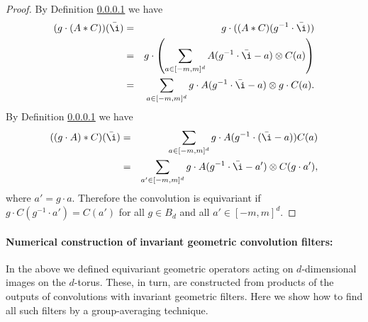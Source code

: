 \documentclass{article}
\theoremstyle{plain}
\begin{document}
\begin{proof}
By Definition \ref{} we have
\begin{eqnarray}
(g\cdot (A* C) )(\bar \i) &=& g\cdot( (A*C)(g^{-1} \cdot \bar \i)) \\
&=& g \cdot \left (\sum_{a\in [-m,m]^d} A(g^{-1}\cdot \bar \i - a) \otimes C(a)\right)\\
&=& \sum_{a\in [-m,m]^d} g \cdot A(g^{-1} \cdot \bar \i -a ) \otimes g \cdot C(a).
\end{eqnarray}
By Definition \ref{} we have
\begin{eqnarray}
((g\cdot A)* C) (\bar \i) &=& \sum_{a\in [-m,m]^d} g\cdot A(g^{-1} \cdot (\bar \i - a) ) C(a) \\
&=& \sum_{a'\in [-m,m]^d} g \cdot A(g^{-1}\cdot \bar \i -a') \otimes C(g\cdot a'),
\end{eqnarray}
where $a'=g\cdot a$. Therefore the convolution is equivariant if $g\cdot C(g^{-1} \cdot a') = C(a')$ for all $g\in B_d$ and all $a' \in [-m,m]^d$. 
\end{proof}

\paragraph{Numerical construction of invariant geometric convolution filters:}
In the above we defined equivariant geometric operators acting on $d$-dimensional images on the $d$-torus.
These, in turn, are constructed from products of the outputs of convolutions with invariant geometric filters.
Here we show how to find all such filters by a group-averaging technique.
\end{document}
